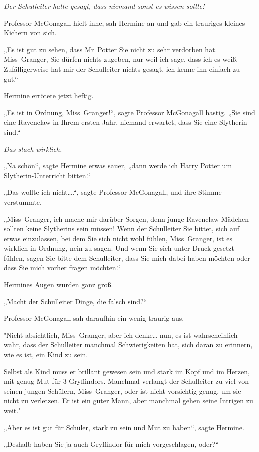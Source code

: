 {\emph{Der Schulleiter hatte gesagt, dass niemand sonst es wissen sollte!}

Professor McGonagall hielt inne, sah Hermine an und gab ein trauriges kleines Kichern von sich.

„Es ist gut zu sehen, dass Mr~Potter Sie nicht zu sehr verdorben hat. Miss~Granger, Sie dürfen nichts zugeben, nur weil ich sage, dass ich es weiß. Zufälligerweise hat mir der Schulleiter nichts gesagt, ich kenne ihn einfach zu gut.“

Hermine errötete jetzt heftig.

„Es ist in Ordnung, Miss~Granger!“, sagte Professor McGonagall hastig. „Sie sind eine Ravenclaw in Ihrem ersten Jahr, niemand erwartet, dass Sie eine Slytherin sind.“

\emph{Das stach wirklich.}

„Na schön“, sagte Hermine etwas sauer, „dann werde ich Harry Potter um Slytherin-Unterricht bitten.“

„Das wollte ich nicht….“, sagte Professor McGonagall, und ihre Stimme verstummte.

„Miss~Granger, ich mache mir darüber Sorgen, denn junge Ravenclaw-Mädchen sollten keine Slytherins sein müssen! Wenn der Schulleiter Sie bittet, sich auf etwas einzulassen, bei dem Sie sich nicht wohl fühlen, Miss~Granger, ist es wirklich in Ordnung, nein zu sagen. Und wenn Sie sich unter Druck gesetzt fühlen, sagen Sie bitte dem Schulleiter, dass Sie mich dabei haben möchten oder dass Sie mich vorher fragen möchten.“

Hermines Augen wurden ganz groß.

„Macht der Schulleiter Dinge, die falsch sind?“

Professor McGonagall sah daraufhin ein wenig traurig aus.

"Nicht absichtlich, Miss~Granger, aber ich denke… nun, es ist wahrscheinlich wahr, dass der Schulleiter manchmal Schwierigkeiten hat, sich daran zu erinnern, wie es ist, ein Kind zu sein.

Selbst als Kind muss er brillant gewesen sein und stark im Kopf und im Herzen, mit genug Mut für 3 Gryffindors. Manchmal verlangt der Schulleiter zu viel von seinen jungen Schülern, Miss~Granger, oder ist nicht vorsichtig genug, um sie nicht zu verletzen. Er ist ein guter Mann, aber manchmal gehen seine Intrigen zu weit."

„Aber es ist gut für Schüler, stark zu sein und Mut zu haben“, sagte Hermine.

„Deshalb haben Sie ja auch Gryffindor für mich vorgeschlagen, oder?“

}
